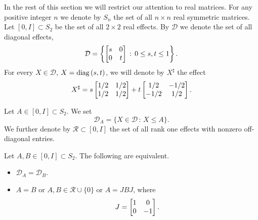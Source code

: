 \documentclass{article}
\begin{document}
In the rest of this section we will restrict our attention to real matrices.  
For any positive integer $n$ we denote by $S_n$ the set of all $n \times n$ real symmetric matrices. Let $[0,I] \subset S_2$ be the set of all $2\times 2$ real effects.
By $\mathcal{D}$ we denote the set of all diagonal effects,
$$
\mathcal{D} = \left\{ \left[ \begin{matrix} s& 0 \cr 0 & t \cr \end{matrix} \right] \, : \, 0 \le s,t \le 1 \right\}.
$$
For every $X \in \mathcal{D}$, $X = {\rm diag}\, (s,t)$, we will denote by $X^\sharp$ the effect
\begin{equation}\label{sharp}
X^\sharp = s  \left[ \begin{matrix} 1/2 & 1/2 \cr 1/2 & 1/2 \cr \end{matrix} \right] + t  \left[ \begin{matrix} 1/2 & -1/2 \cr -1/2 & 1/2 \cr \end{matrix} \right].
\end{equation}

Let $A \in [0,I] \subset S_2$. We set $$
\mathcal{D}_A = \{ X  \in \mathcal{D} \, : \, X \le A \}.
$$
We further denote by $\mathcal{R} \subset [0,I]$ the set of all rank one effects with nonzero off-diagonal entries.

\begin{lemma}\label{max}
Let $A,B \in [0,I] \subset S_2$. The following are equivalent.
\begin{itemize}
\item $\mathcal{D}_A = \mathcal{D}_B$.
\item $A= B$ or $A,B \in \mathcal{R} \cup \{ 0 \}$ or $A = JBJ$,
where
$$
J = \left[ \begin{matrix} 1& 0 \cr 0 & -1 \cr \end{matrix} \right] .
$$
\end{itemize}
\end{lemma}
\end{document}
